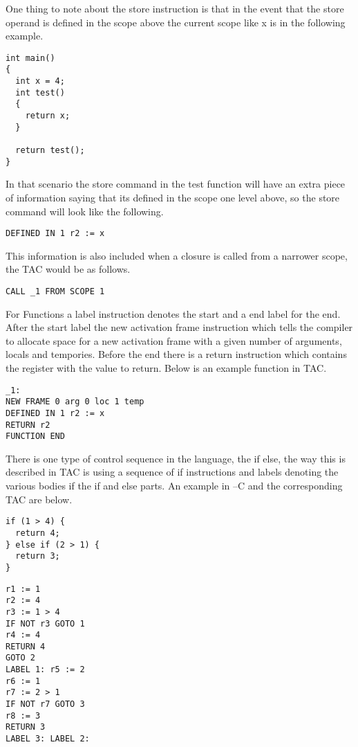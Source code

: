 \documentclass{article}
\begin{document}
One thing to note about the store instruction is that in the event that the store
operand is defined in the scope above the current scope like x is in the following example.

\begin{lstlisting}
int main()
{
  int x = 4;
  int test()
  {
    return x;
  }

  return test();
}
\end{lstlisting}

In that scenario the store command in the test function will have an extra piece
of information saying that its defined in the scope one level above, so the store command will
look like the following.

\begin{lstlisting}
DEFINED IN 1 r2 := x
\end{lstlisting}

This information is also included when a closure is called from a narrower scope,
the TAC would be as follows.

\begin{lstlisting}
CALL _1 FROM SCOPE 1
\end{lstlisting}

For Functions a label instruction denotes the start and a end label for the end.
After the start label the new activation frame instruction which tells
the compiler to allocate space for a new activation frame with a given number
of arguments, locals and tempories. Before the end there is a return instruction
which contains the register with the value to return. Below is an example function
in TAC.

\begin{lstlisting}
_1:
NEW FRAME 0 arg 0 loc 1 temp
DEFINED IN 1 r2 := x
RETURN r2
FUNCTION END
\end{lstlisting}

There is one type of control sequence in the language, the if else, the way this
is described in TAC is using a sequence of if instructions and labels denoting the
various bodies if the if and else parts. An example in --C and the corresponding TAC
are below.

\begin{lstlisting}
if (1 > 4) {
  return 4;
} else if (2 > 1) {
  return 3;
}
\end{lstlisting}

\begin{lstlisting}
r1 := 1
r2 := 4
r3 := 1 > 4
IF NOT r3 GOTO 1
r4 := 4
RETURN 4
GOTO 2
LABEL 1: r5 := 2
r6 := 1
r7 := 2 > 1
IF NOT r7 GOTO 3
r8 := 3
RETURN 3
LABEL 3: LABEL 2:
\end{lstlisting}
\end{document}
